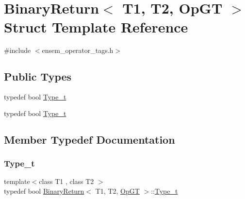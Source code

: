 \hypertarget{structBinaryReturn_3_01T1_00_01T2_00_01OpGT_01_4}{}\section{Binary\+Return$<$ T1, T2, Op\+GT $>$ Struct Template Reference}
\label{structBinaryReturn_3_01T1_00_01T2_00_01OpGT_01_4}


{\ttfamily \#include $<$ensem\+\_\+operator\+\_\+tags.\+h$>$}

\subsection*{Public Types}
\begin{DoxyCompactItemize}
\item 
typedef bool \mbox{\hyperlink{structBinaryReturn_3_01T1_00_01T2_00_01OpGT_01_4_ac4478a3194da16a795fb10b5a100ff48}{Type\+\_\+t}}
\item 
typedef bool \mbox{\hyperlink{structBinaryReturn_3_01T1_00_01T2_00_01OpGT_01_4_ac4478a3194da16a795fb10b5a100ff48}{Type\+\_\+t}}
\end{DoxyCompactItemize}


\subsection{Member Typedef Documentation}
\mbox{\label{structBinaryReturn_3_01T1_00_01T2_00_01OpGT_01_4_ac4478a3194da16a795fb10b5a100ff48}} 
\subsubsection{\texorpdfstring{Type\_t}{Type\_t}\hspace{0.1cm}{\footnotesize\ttfamily [1/2]}}
{\footnotesize\ttfamily template$<$class T1 , class T2 $>$ \\
typedef bool \mbox{\hyperlink{structBinaryReturn}{Binary\+Return}}$<$ T1, T2, \mbox{\hyperlink{structOpGT}{Op\+GT}} $>$\+::\mbox{\hyperlink{structBinaryReturn_3_01T1_00_01T2_00_01OpGT_01_4_ac4478a3194da16a795fb10b5a100ff48}{Type\+\_\+t}}}

\mbox{\label{structBinaryReturn_3_01T1_00_01T2_00_01OpGT_01_4_ac4478a3194da16a795fb10b5a100ff48}} 
